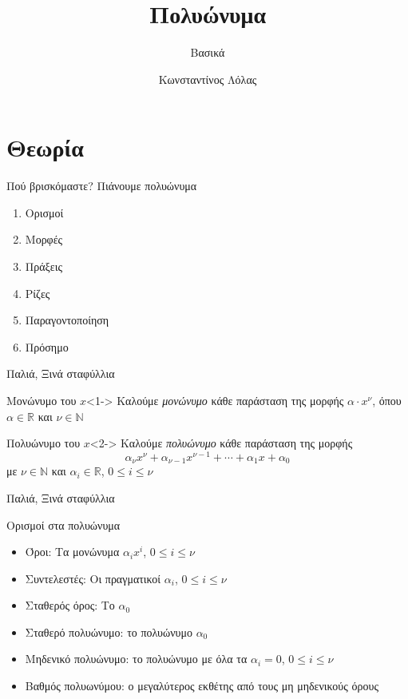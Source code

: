 \documentclass{presentation}
\title{Πολυώνυμα}
\subtitle{Βασικά}
\author[Λόλας]{Κωνσταντίνος Λόλας}
\date{}
\begin{document}
\begin{frame}
  \titlepage
\end{frame}

\section{Θεωρία}
\begin{frame}{Πού βρισκόμαστε?}
  Πιάνουμε πολυώνυμα
  \begin{enumerate}
    \item<1-> Ορισμοί
    \item<2-> Μορφές
    \item<3-> Πράξεις
    \item<4-> Ρίζες
    \item<5-> Παραγοντοποίηση
    \item<6-> Πρόσημο
  \end{enumerate}
\end{frame}

\begin{frame}{Παλιά, Ξινά σταφύλλια}
  \begin{block}{Μονώνυμο του $x$}<1->
    Καλούμε \emph{μονώνυμο} κάθε παράσταση της μορφής $α\cdot x^ν$, όπου $α\in \mathbb{R}$ και $ν\in \mathbb{N}$
  \end{block}
  \begin{block}{Πολυώνυμο του $x$}<2->
    Καλούμε \emph{πολυώνυμο} κάθε παράσταση της μορφής
    $$α_νx^ν+α_{ν-1}x^{ν-1}+\cdots+α_1x+α_0$$
    με $ν\in\mathbb{N}$ και $α_i\in\mathbb{R}$, $0\le i \le ν$
  \end{block}
\end{frame}

\begin{frame}{Παλιά, Ξινά σταφύλλια}
  \begin{block}{Ορισμοί στα πολυώνυμα}
    \begin{itemize}
      \item Όροι: Τα μονώνυμα $α_ix^i$, $0\le i \le ν$
      \item Συντελεστές: Οι πραγματικοί $α_i$, $0\le i \le ν$
      \item Σταθερός όρος: Το $α_0$
      \item Σταθερό πολυώνυμο: το πολυώνυμο $α_0$
      \item Μηδενικό πολυώνυμο: το πολυώνυμο με όλα τα $α_i=0$, $0\le i \le ν$
      \item Βαθμός πολυωνύμου: ο μεγαλύτερος εκθέτης από τους μη μηδενικούς όρους
    \end{itemize}

  \end{block}
\end{frame}
\end{document}
